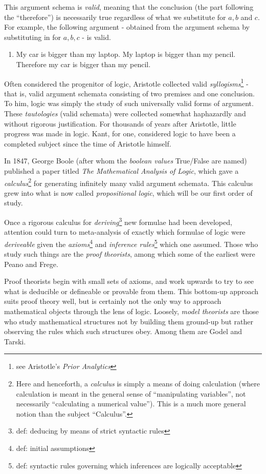 This argument schema is \emph{valid}, meaning that the conclusion (the part following the ``therefore'') is necessarily true regardless of what we substitute for $a, b$ and $c$. For example, the following argument - obtained from the argument schema by substituting in for $a, b, c$ - is valid. 
\begin{enumerate}
  \addtocounter{enumi}{1}
  \item My car is bigger than my laptop. My laptop is bigger than my pencil. Therefore my car is bigger than my pencil. 
 \end{enumerate} 

Often considered the progenitor of logic, Aristotle collected valid \emph{syllogisms}\footnote{see Aristotle's \emph{Prior Analytics}} - that is, valid argument schemata consisting of two premises and one conclusion. To him, logic was simply the study of such universally valid forms of argument. These \emph{tautologies} (valid schemata) were collected somewhat haphazardly and without rigorous justification. For thousands of years after Aristotle, little progress was made in logic. Kant, for one, considered logic to have been a completed subject since the time of Aristotle himself. 

In 1847, George Boole (after whom the \emph{boolean values} True/False are named) published a paper titled \emph{The Mathematical Analysis of Logic}, which gave a \emph{calculus}\footnote{Here and henceforth, a \emph{calculus} is simply a means of doing calculation (where calculation is meant in the general sense of ``manipulating variables'', not necessarily ``calculating a numerical value''). This is a much more general notion than the subject ``Calculus''.} for generating infinitely many valid argument schemata. This calculus grew into what is now called \emph{propositional logic}, which will be our first order of study. 

Once a rigorous calculus for \emph{deriving}\footnote{def: deducing by means of strict syntactic rules} new formulae had been developed, attention could turn to meta-analysis of exactly which formulae of logic were \emph{deriveable} given the \emph{axioms}\footnote{def: initial assumptions} and \emph{inference rules}\footnote{def: syntactic rules governing which inferences are logically acceptable} which one assumed. Those who study such things are the \emph{proof theorists}, among which some of the earliest were Peano and Frege.

Proof theorists begin with small sets of axioms, and work upwards to try to see what is deducible or defineable or provable from them. This bottom-up approach suits proof theory well, but is certainly not the only way to approach mathematical objects through the lens of logic. Loosely, \emph{model theorists} are those who study mathematical structures not by building them ground-up but rather observing the rules which such structures obey. Among them are Godel and Tarski. 

